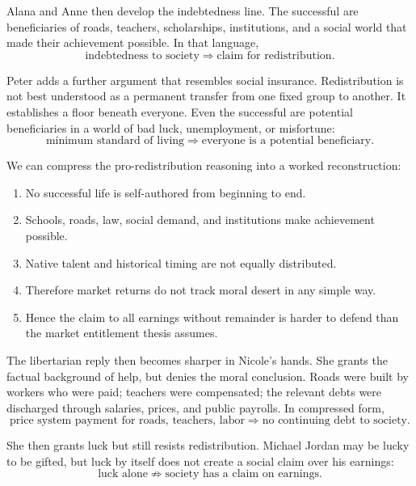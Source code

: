 Alana and Anne then develop the indebtedness line. The successful are beneficiaries of roads, teachers, scholarships, institutions, and a social world that made their achievement possible. In that language,
\begin{equation}
\text{indebtedness to society}
\Longrightarrow
\text{claim for redistribution}.
\end{equation}

Peter adds a further argument that resembles social insurance. Redistribution is not best understood as a permanent transfer from one fixed group to another. It establishes a floor beneath everyone. Even the successful are potential beneficiaries in a world of bad luck, unemployment, or misfortune:
\begin{equation}
\text{minimum standard of living}
\Longrightarrow
\text{everyone is a potential beneficiary}.
\end{equation}

We can compress the pro-redistribution reasoning into a worked reconstruction:
\begin{enumerate}
\item No successful life is self-authored from beginning to end.
\item Schools, roads, law, social demand, and institutions make achievement possible.
\item Native talent and historical timing are not equally distributed.
\item Therefore market returns do not track moral desert in any simple way.
\item Hence the claim to all earnings without remainder is harder to defend than the market entitlement thesis assumes.
\end{enumerate}

The libertarian reply then becomes sharper in Nicole's hands. She grants the factual background of help, but denies the moral conclusion. Roads were built by workers who were paid; teachers were compensated; the relevant debts were discharged through salaries, prices, and public payrolls. In compressed form,
\begin{equation}
\text{price system payment for roads, teachers, labor}
\Longrightarrow
\text{no continuing debt to society}.
\end{equation}

She then grants luck but still resists redistribution. Michael Jordan may be lucky to be gifted, but luck by itself does not create a social claim over his earnings:
\begin{equation}
\text{luck alone}
\not\Longrightarrow
\text{society has a claim on earnings}.
\end{equation}


